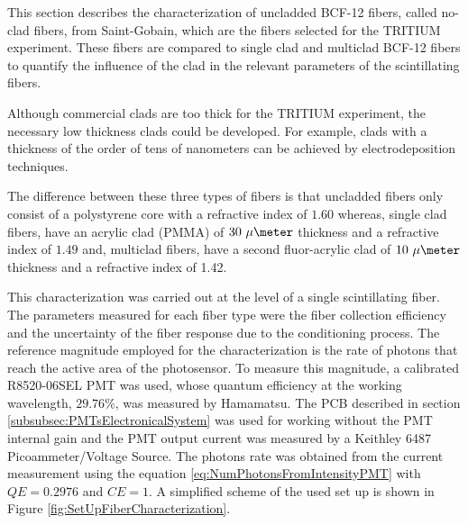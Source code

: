 This section describes the characterization of uncladded BCF-12 fibers, called no-clad fibers, from Saint-Gobain, which are the fibers selected for the TRITIUM experiment. These fibers are compared to single clad and multiclad BCF-12 fibers to quantify the influence of the clad in the relevant parameters of the scintillating fibers.

Although commercial clads are too thick for the TRITIUM experiment, the necessary low thickness clads could be developed. For example, clads with a thickness of the order of tens of nanometers can be achieved by electrodeposition techniques.

The difference between these three types of fibers is that uncladded fibers only consist of a polystyrene core with a refractive index of $1.60$ whereas, single clad fibers, have an acrylic clad (PMMA) of $30~\mu\meter$ thickness and a refractive index of $1.49$ and, multiclad fibers, have a second fluor-acrylic clad of $10~\mu\meter$ thickness  and a refractive index of 1.42.




This characterization was carried out at the level of a single scintillating fiber. The parameters measured for each fiber type were the fiber collection efficiency and the uncertainty of the fiber response due to the conditioning process. The reference magnitude employed for the characterization is the rate of photons that reach the active area of the photosensor. To measure this magnitude, a calibrated R8520-06SEL PMT was used, whose quantum efficiency at the working wavelength, $29.76\%$, was measured by Hamamatsu. The PCB described in section \ref{subsubsec:PMTsElectronicalSystem} was used for working without the PMT internal gain and the PMT output current was measured by a Keithley 6487 Picoammeter/Voltage Source. The photons rate was obtained from the current measurement using the equation \ref{eq:NumPhotonsFromIntensityPMT} with $QE=0.2976$ and $CE=1$. A simplified scheme of the used set up is shown in Figure \ref{fig:SetUpFiberCharacterization}.

